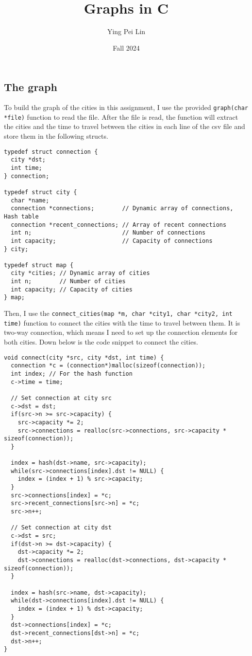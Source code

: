 \documentclass[a4paper,11pt]{article}
\begin{document}
\title{
  \textbf{Graphs in C}
}
\author{Ying Pei Lin}
\date{Fall 2024}

\maketitle

\subsection*{The graph}

To build the graph of the cities in this assignment, I use the provided {\tt *graph(char *file)} function
to read the file. After the file is read, the function will extract the cities and the time to travel
between the cities in each line of the csv file and store them in the following structs.

\begin{verbatim}
typedef struct connection {
  city *dst;
  int time;
} connection;

typedef struct city {
  char *name;
  connection *connections;        // Dynamic array of connections, Hash table
  connection *recent_connections; // Array of recent connections
  int n;                          // Number of connections
  int capacity;                   // Capacity of connections
} city;

typedef struct map {
  city *cities; // Dynamic array of cities
  int n;        // Number of cities
  int capacity; // Capacity of cities
} map;
\end{verbatim}

Then, I use the {\tt connect\_cities(map *m, char *city1, char *city2, int time)} function
to connect the cities with the time to travel between them. It is two-way connection, which
means I need to set up the connection elements for both cities. Down below is the code snippet
to connect the cities.

\begin{verbatim}
void connect(city *src, city *dst, int time) {
  connection *c = (connection*)malloc(sizeof(connection));
  int index; // For the hash function
  c->time = time;

  // Set connection at city src
  c->dst = dst;
  if(src->n >= src->capacity) {
    src->capacity *= 2;
    src->connections = realloc(src->connections, src->capacity * sizeof(connection));
  }

  index = hash(dst->name, src->capacity);
  while(src->connections[index].dst != NULL) {
    index = (index + 1) % src->capacity;
  }
  src->connections[index] = *c;
  src->recent_connections[src->n] = *c;
  src->n++;

  // Set connection at city dst
  c->dst = src;
  if(dst->n >= dst->capacity) {
    dst->capacity *= 2;
    dst->connections = realloc(dst->connections, dst->capacity * sizeof(connection));
  }

  index = hash(src->name, dst->capacity);
  while(dst->connections[index].dst != NULL) {
    index = (index + 1) % dst->capacity;
  }
  dst->connections[index] = *c;
  dst->recent_connections[dst->n] = *c;
  dst->n++;
}
\end{verbatim}
\end{document}
